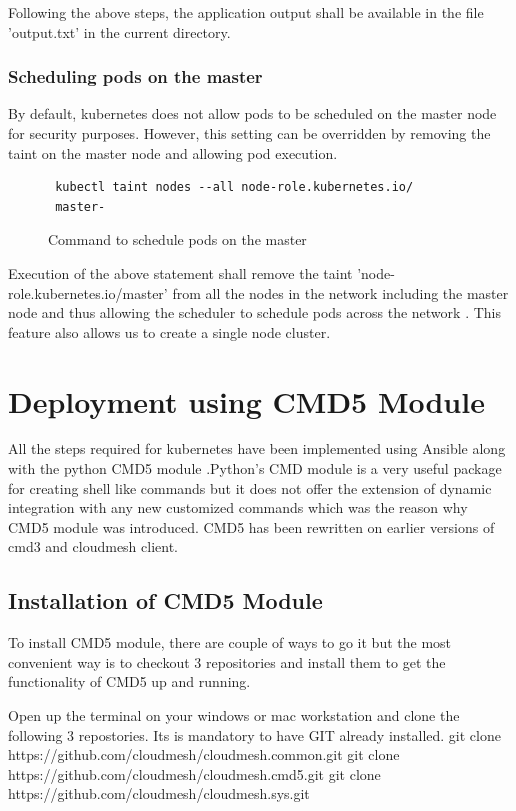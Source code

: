 \documentclass[9pt,twocolumn,twoside]{../../styles/osajnl}
\begin{document}
Following the above steps, the application output shall be available
in the file 'output.txt' in the current directory.


\subsubsection{Scheduling pods on the master}
By default, kubernetes does not allow pods to be
scheduled on the master node for security purposes. However, this
setting can be overridden by removing the taint on the master node and
allowing pod execution.
\begin{figure}[H]
\begin{verbatim}
 kubectl taint nodes --all node-role.kubernetes.io/
 master-
\end{verbatim}
\caption{Command to schedule pods on the master}
\vspace{-4mm}
\label{Command to schedule pods on the master}
\end{figure}

Execution of the above statement shall remove the taint
'node-role.kubernetes.io/master' from all the nodes in the network
including the master node and thus allowing the scheduler to schedule
pods across the network \cite{www-kubernetes-kubeadm}. This feature
also allows us to create a single node cluster.

\section{Deployment using CMD5 Module}
All the steps required for kubernetes have been implemented using
Ansible along with the python CMD5 module \cite{www-cmd5}.Python's CMD
module is a very useful package for creating shell like commands but
it does not offer the extension of dynamic integration with any new
customized commands which was the reason why CMD5 module was
introduced. CMD5 has been rewritten on earlier versions of cmd3 and
cloudmesh client.

\subsection{Installation of CMD5 Module}
To install CMD5 module, there are couple of ways to go it but the most
convenient way is to checkout 3 repositories and install them to get
the functionality of CMD5 up and running.

Open up the terminal on your windows or mac workstation and clone the
following 3 repostories. Its is mandatory to have GIT already
installed. \newline git clone
https://github.com/cloudmesh/cloudmesh.common.git \newline git clone
https://github.com/cloudmesh/cloudmesh.cmd5.git \newline  git clone
https://github.com/cloudmesh/cloudmesh.sys.git \newline
\end{document}
